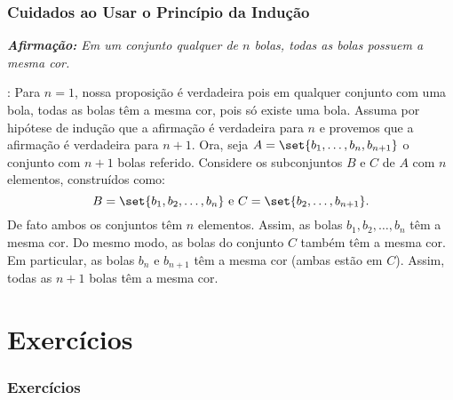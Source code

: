 \documentclass[brazil, notheorems, 10pt]{beamer}
\begin{document}
\begin{frame}
\frametitle{Cuidados ao Usar o Princípio da Indução} %

\emph{\textbf{Afirmação:} Em um conjunto qualquer de $n$ bolas,
todas as bolas possuem a mesma cor.}

: Para $n=1$, nossa proposição é verdadeira pois em
qualquer conjunto com uma bola, todas as bolas têm a mesma cor, pois
só existe uma bola. Assuma por hipótese de indução que a afirmação é
verdadeira para $n$ e provemos que a afirmação é verdadeira para
$n+1$. Ora, seja $A = \set {b_1, \dots, b_n, b_{n+1}}$ o conjunto
com $n+1$ bolas referido. Considere os subconjuntos $B$ e $C$ de $A$
com $n$ elementos, construídos como:
$$B = \set {b_1, b_2, \dots, b_n} \text{ e } C= \set{ b_2, \dots,
b_{n+1}}.$$ De fato ambos os conjuntos têm $n$ elementos. Assim, as
bolas $b_1, b_2, \dots , b_n$ têm a mesma cor. Do mesmo modo, as
bolas do conjunto $C$ também têm a mesma cor. Em particular, as
bolas $b_n$ e $b_{n+1}$ têm a mesma cor (ambas estão em $C$). Assim,
todas as $n+1$ bolas têm a mesma cor.


\end{frame}



\section{Exercícios}
\begin{frame}
\frametitle{Exercícios} %




\end{frame}
\end{document}
